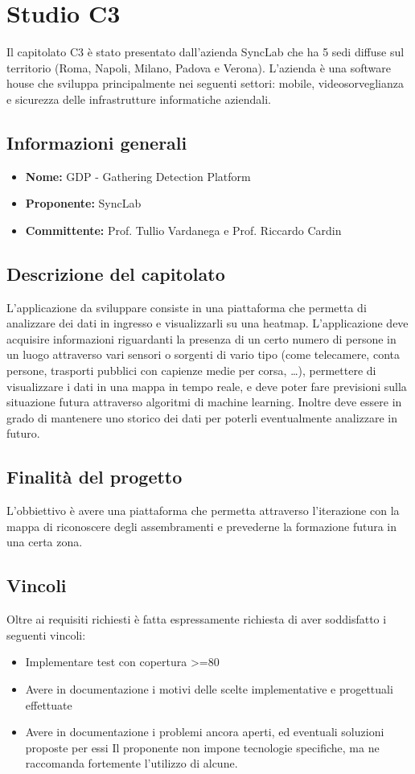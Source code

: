 \section{Studio C3}
Il capitolato C3 è stato presentato dall'azienda SyncLab che ha 5 sedi diffuse sul territorio (Roma, Napoli, Milano, Padova e Verona). L'azienda è una software house che sviluppa principalmente nei seguenti settori: mobile, videosorveglianza e sicurezza delle infrastrutture informatiche aziendali.

\subsection{Informazioni generali}
\begin{itemize}
    \item \textbf{Nome:} GDP - Gathering Detection Platform
    \item \textbf{Proponente:} SyncLab
    \item \textbf{Committente:} Prof. Tullio Vardanega e Prof. Riccardo Cardin
\end{itemize}

\subsection{Descrizione del capitolato}
L'applicazione da sviluppare consiste in una piattaforma che permetta di analizzare dei dati in ingresso e visualizzarli su una heatmap. L'applicazione deve acquisire informazioni riguardanti la presenza di un certo numero di persone in un luogo attraverso vari sensori o sorgenti di vario tipo (come telecamere, conta persone, trasporti pubblici con capienze medie per corsa, …), permettere di visualizzare i dati in una mappa in tempo reale, e deve poter fare previsioni sulla situazione futura attraverso algoritmi di machine learning. Inoltre deve essere in grado di mantenere uno storico dei dati per poterli eventualmente analizzare in futuro.

\subsection{Finalità del progetto}
L'obbiettivo è avere una piattaforma che permetta attraverso l'iterazione con la mappa di riconoscere degli assembramenti e prevederne la formazione futura in una certa zona.

\subsection{Vincoli}
Oltre ai requisiti richiesti è fatta espressamente richiesta di aver soddisfatto i seguenti vincoli:
\begin{itemize}
    \item Implementare test con copertura >=80
    \item Avere in documentazione i motivi delle scelte implementative e progettuali effettuate
    \item Avere in documentazione i problemi ancora aperti, ed eventuali soluzioni proposte per essi
    Il proponente non impone tecnologie specifiche, ma ne raccomanda fortemente l’utilizzo di alcune.
\end{itemize}


